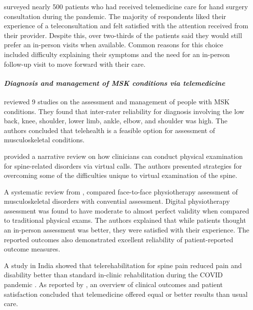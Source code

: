\documentclass[utf8]{FrontiersinHarvard} %
\begin{document}
\citet{ahmadPatientPerspectivesTelemedicine2023} surveyed nearly 500 patients who had received telemedicine care for hand surgery consultation during the pandemic. The majority of respondents liked their experience of a teleconsultation and felt satisfied with the attention received from their provider. Despite this, over two-thirds of the patients said they would still prefer an in-person visits when available. Common reasons for this choice included difficulty explaining their symptoms and the need for an in-person follow-up visit to move forward with their care.

\paragraph{\textit{Diagnosis and management of MSK conditions via telemedicine}}

\citet{ohAgreementConcurrentValidity2024} reviewed 9 studies on the assessment and management of people with MSK conditions. They found that inter-rater reliability for diagnosis involving the low back, knee, shoulder, lower limb, ankle, elbow, and shoulder was high. The authors concluded that telehealth is a feasible option for assessment of musculoskeletal conditions.

\citet{satinVirtualSpineExamination2021} provided a narrative review on how clinicians can conduct physical examination for spine-related disorders via virtual calls. The authors presented strategies for overcoming some of the difficulties unique to virtual examination of the spine.

A systematic review from \citet{bernhardssonDigitalPhysiotherapyAssessment2023}, compared face-to-face physiotherapy assessment of musculoskeletal disorders with convential assessment. Digital physiotherapy assessment was found to have moderate to almost perfect validity when compared to traditional physical exams. The authors explained that while patients thought an in-person assessment was better, they were satisfied with their experience. The reported outcomes also demonstrated excellent reliability of patient-reported outcome measures.

A study in India showed that telerehabilitation for spine pain reduced pain and disability better than standard in-clinic rehabilitation during the COVID pandemic \citep{shahEfficacyTelerehabilitationSpine2024}. As reported by \citet{barberioTransitioningTelehealthTodays2021}, an overview of clinical outcomes and patient satisfaction concluded that telemedicine offered equal or better results than usual care.
\end{document}
